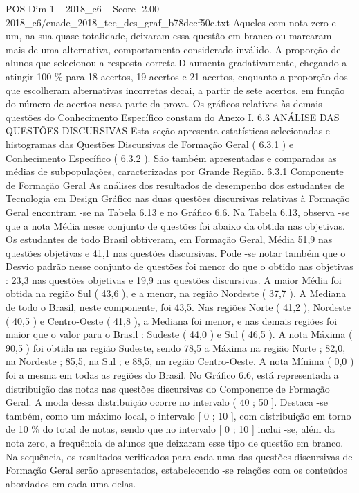 \begin{textsample}{POS Dim 1 – 2018\_c6 – Score -2.00 – 2018\_c6/enade\_2018\_tec\_des\_graf\_b78dccf50c.txt}
Aqueles com nota zero e um, na sua quase totalidade, deixaram essa questão em branco ou marcaram mais de uma alternativa, comportamento considerado inválido.
A proporção de alunos que selecionou a resposta correta D aumenta gradativamente, chegando a atingir 100 \% para 18 acertos, 19 acertos e 21 acertos, enquanto a proporção dos que escolheram alternativas incorretas decai, a partir de sete acertos, em função do número de acertos nessa parte da prova.
Os gráficos relativos às demais questões do Conhecimento Específico constam do Anexo I. 6.3 ANÁLISE DAS QUESTÕES DISCURSIVAS Esta seção apresenta estatísticas selecionadas e histogramas das Questões Discursivas de Formação Geral ( 6.3.1 ) e Conhecimento Específico ( 6.3.2 ).
São também apresentadas e comparadas as médias de subpopulações, caracterizadas por Grande Região. 6.3.1 Componente de Formação Geral As análises dos resultados de desempenho dos estudantes de Tecnologia em Design Gráfico nas duas questões discursivas relativas à Formação Geral encontram -se na Tabela 6.13 e no Gráfico 6.6.
Na Tabela 6.13, observa -se que a nota Média nesse conjunto de questões foi abaixo da obtida nas objetivas.
Os estudantes de todo Brasil obtiveram, em Formação Geral, Média 51,9 nas questões objetivas e 41,1 nas questões discursivas.
Pode -se notar também que o Desvio padrão nesse conjunto de questões foi menor do que o obtido nas objetivas : 23,3 nas questões objetivas e 19,9 nas questões discursivas.
A maior Média foi obtida na região Sul ( 43,6 ), e a menor, na região Nordeste ( 37,7 ).
A Mediana de todo o Brasil, neste componente, foi 43,5.
Nas regiões Norte ( 41,2 ), Nordeste ( 40,5 ) e Centro-Oeste ( 41,8 ), a Mediana foi menor, e nas demais regiões foi maior que o valor para o Brasil : Sudeste ( 44,0 ) e Sul ( 46,5 ).
A nota Máxima ( 90,5 ) foi obtida na região Sudeste, sendo 78,5 a Máxima na região Norte ; 82,0, na Nordeste ; 85,5, na Sul ; e 88,5, na região Centro-Oeste.
A nota Mínima ( 0,0 ) foi a mesma em todas as regiões do Brasil.
No Gráfico 6.6, está representada a distribuição das notas nas questões discursivas do Componente de Formação Geral.
A moda dessa distribuição ocorre no intervalo ( 40 ; 50 ].
Destaca -se também, como um máximo local, o intervalo [ 0 ; 10 ], com distribuição em torno de 10 \% do total de notas, sendo que no intervalo [ 0 ; 10 ] inclui -se, além da nota zero, a frequência de alunos que deixaram esse tipo de questão em branco.
Na sequência, os resultados verificados para cada uma das questões discursivas de Formação Geral serão apresentados, estabelecendo -se relações com os conteúdos abordados em cada uma delas.

\end{textsample}
